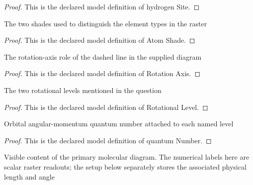 \begin{proof}
  This is the declared model definition of hydrogen Site.
\end{proof}
\begin{definition}
  \label{def:physics:phyx-mini-0571:phyxminiproblems-problemphyxmini0571-atomshade}
  The two shades used to distinguish the element types in the raster
\end{definition}
\begin{proof}
  This is the declared model definition of Atom Shade.
\end{proof}
\begin{definition}
  \label{def:physics:phyx-mini-0571:phyxminiproblems-problemphyxmini0571-rotationaxis}
  The rotation-axis role of the dashed line in the supplied diagram
\end{definition}
\begin{proof}
  This is the declared model definition of Rotation Axis.
\end{proof}
\begin{definition}
  \label{def:physics:phyx-mini-0571:phyxminiproblems-problemphyxmini0571-rotationallevel}
  The two rotational levels mentioned in the question
\end{definition}
\begin{proof}
  This is the declared model definition of Rotational Level.
\end{proof}
\begin{definition}
  \label{def:physics:phyx-mini-0571:phyxminiproblems-problemphyxmini0571-rotationallevel-quantumnumber}
  Orbital angular-momentum quantum number attached to each named level
\end{definition}
\begin{proof}
  This is the declared model definition of quantum Number.
\end{proof}
\begin{definition}
  \label{def:physics:phyx-mini-0571:phyxminiproblems-problemphyxmini0571-watermoleculefigure}
  Visible content of the primary molecular diagram. The numerical labels here are scalar raster readouts; the setup below separately stores the associated physical length and angle
\end{definition}
